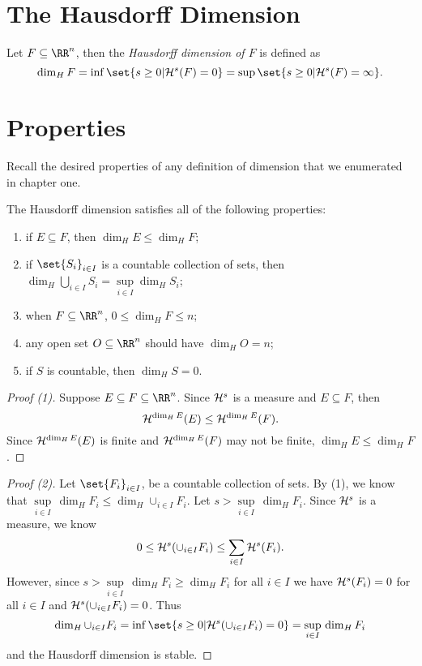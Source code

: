 \section{The Hausdorff Dimension}

\begin{definition}
	Let $F\subseteq\RR^n$, then the \textit{Hausdorff dimension of $F$} is defined as
	\[
		\dim_H F = \inf\set{s\geq 0 | \hm^s(F) = 0} = \sup\set{s\geq 0 | \hm^s(F)=\infty}.
	\]
\end{definition}

\section{Properties}

Recall the desired properties of any definition of dimension that we enumerated in chapter one.

\begin{thm}
	The Hausdorff dimension satisfies all of the following properties:
	\begin{enumerate}
		\item if $E\subseteq F$, then $\dim_H E\leq\dim_H F$;
		\item if $\set{S_i}_{i\in I}$ is a countable collection of sets, then $\dim_H \bigcup_{i\in I} S_i = \sup\limits_{i\in I}\dim_H S_i$;
		\item when $F\subseteq \RR^n$, $0\leq \dim_H F\leq n$;
		\item any open set $O\subseteq \RR^n$ should have $\dim_H O = n$;
		\item if $S$ is countable, then $\dim_H S=0$.
	\end{enumerate}
\end{thm}

\begin{proof}[Proof (1)]
	Suppose $E\subseteq F\subseteq\RR^n$.
	Since $\mathcal{H}^s$ is a measure and $E\subseteq F$, then
	\[
		\mathcal{H}^{\operatorname{dim}_H E} (E) \leq \mathcal{H}^{\operatorname{dim}_H E} (F).
	\]
	Since $\mathcal{H}^{\operatorname{dim}_H E}(E)$ is finite and $\mathcal{H}^{\operatorname{dim}_H E}(F)$ may not be finite, $\dim_H E \leq \dim_H F$.
\end{proof}

\begin{proof}[Proof (2)]
	Let $\set{F_i}_{i\in I}$, be a countable collection of sets.
	By (1), we know that $\sup\limits_{i\in I}\, \dim_H F_i \leq\dim_H \cup_{i\in I} F_i$.
	Let $s > \sup\limits_{i\in I}\, \dim_H F_i$.
	Since $\mathcal{H}^s$ is a measure, we know
	\[
		0\leq \mathcal{H}^s (\cup_{i\in I} F_i) \leq \sum_{i\in I} \mathcal{H}^s(F_i).
	\]
	However, since $s > \sup\limits_{i\in I}\, \dim_H F_i \geq \dim_H F_i$ for all $i\in I$ we have $\mathcal{H}^s(F_i)=0$ for all $i\in I$ and $\mathcal{H}^s (\cup_{i\in I} F_i) = 0$.
	Thus
	\[
		\dim_H \cup_{i\in I} F_i = \inf\set{s\geq 0 | \hm^s(\cup_{i\in I} F_i) = 0} =\sup\limits_{i\in I}\, \dim_H F_i
	\]
	and the Hausdorff dimension is stable.
\end{proof}

